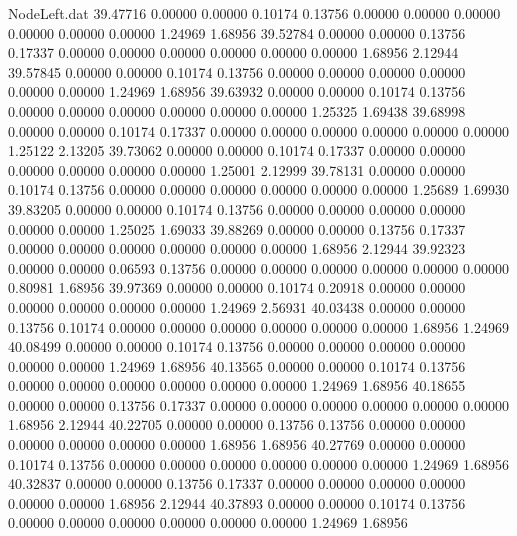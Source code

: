 \begin{filecontents}{NodeLeft.dat}
  39.47716    0.00000    0.00000     0.10174    0.13756    0.00000    0.00000    0.00000    0.00000    0.00000    0.00000    1.24969    1.68956
  39.52784    0.00000    0.00000     0.13756    0.17337    0.00000    0.00000    0.00000    0.00000    0.00000    0.00000    1.68956    2.12944
  39.57845    0.00000    0.00000     0.10174    0.13756    0.00000    0.00000    0.00000    0.00000    0.00000    0.00000    1.24969    1.68956
  39.63932    0.00000    0.00000     0.10174    0.13756    0.00000    0.00000    0.00000    0.00000    0.00000    0.00000    1.25325    1.69438
  39.68998    0.00000    0.00000     0.10174    0.17337    0.00000    0.00000    0.00000    0.00000    0.00000    0.00000    1.25122    2.13205
  39.73062    0.00000    0.00000     0.10174    0.17337    0.00000    0.00000    0.00000    0.00000    0.00000    0.00000    1.25001    2.12999
  39.78131    0.00000    0.00000     0.10174    0.13756    0.00000    0.00000    0.00000    0.00000    0.00000    0.00000    1.25689    1.69930
  39.83205    0.00000    0.00000     0.10174    0.13756    0.00000    0.00000    0.00000    0.00000    0.00000    0.00000    1.25025    1.69033
  39.88269    0.00000    0.00000     0.13756    0.17337    0.00000    0.00000    0.00000    0.00000    0.00000    0.00000    1.68956    2.12944
  39.92323    0.00000    0.00000     0.06593    0.13756    0.00000    0.00000    0.00000    0.00000    0.00000    0.00000    0.80981    1.68956
  39.97369    0.00000    0.00000     0.10174    0.20918    0.00000    0.00000    0.00000    0.00000    0.00000    0.00000    1.24969    2.56931
  40.03438    0.00000    0.00000     0.13756    0.10174    0.00000    0.00000    0.00000    0.00000    0.00000    0.00000    1.68956    1.24969
  40.08499    0.00000    0.00000     0.10174    0.13756    0.00000    0.00000    0.00000    0.00000    0.00000    0.00000    1.24969    1.68956
  40.13565    0.00000    0.00000     0.10174    0.13756    0.00000    0.00000    0.00000    0.00000    0.00000    0.00000    1.24969    1.68956
  40.18655    0.00000    0.00000     0.13756    0.17337    0.00000    0.00000    0.00000    0.00000    0.00000    0.00000    1.68956    2.12944
  40.22705    0.00000    0.00000     0.13756    0.13756    0.00000    0.00000    0.00000    0.00000    0.00000    0.00000    1.68956    1.68956
  40.27769    0.00000    0.00000     0.10174    0.13756    0.00000    0.00000    0.00000    0.00000    0.00000    0.00000    1.24969    1.68956
  40.32837    0.00000    0.00000     0.13756    0.17337    0.00000    0.00000    0.00000    0.00000    0.00000    0.00000    1.68956    2.12944
  40.37893    0.00000    0.00000     0.10174    0.13756    0.00000    0.00000    0.00000    0.00000    0.00000    0.00000    1.24969    1.68956

\end{filecontents}
